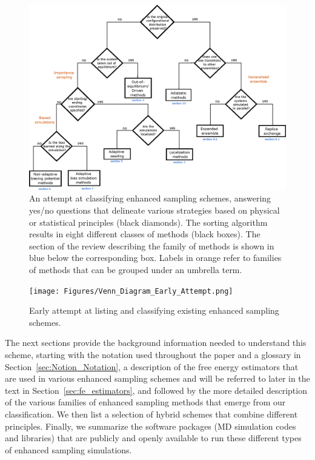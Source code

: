 \documentclass[9pt,review]{livecoms}
\begin{document}
\begin{figure}[!htb]
\includegraphics[scale=0.85]{Figures/Enhanced_sampling_sorting_final.eps}
  \caption{An attempt at classifying enhanced sampling schemes, answering yes/no questions that delineate various strategies based on physical or statistical principles (black diamonds). The sorting algorithm results in eight different classes of methods (black boxes). The section of the review describing the family of methods is shown in blue below the corresponding box. Labels in orange refer to families of methods that can be grouped under an umbrella term.}
  \label{fig:scheme}
\end{figure}

\begin{figure}[!htb]
  \texttt{[image: Figures/Venn\_Diagram\_Early\_Attempt.png]}
  \caption{Early attempt at listing and classifying existing enhanced sampling schemes.}
  \label{fig:VennD}
\end{figure}

The next sections provide the background information needed to understand this scheme, starting with the notation used throughout the paper and a glossary in Section~\ref{sec:Notion_Notation}, a description of the free energy estimators that are used in various enhanced sampling schemes and will be referred to later in the text in Section~\ref{sec:fe_estimators}, and followed by the more detailed description of the various families of enhanced sampling methods that emerge from our classification. We then list a selection of hybrid schemes that combine different principles. Finally, we summarize the software packages (MD simulation codes and libraries) that are publicly and openly available to run these different types of enhanced sampling simulations.
\end{document}
